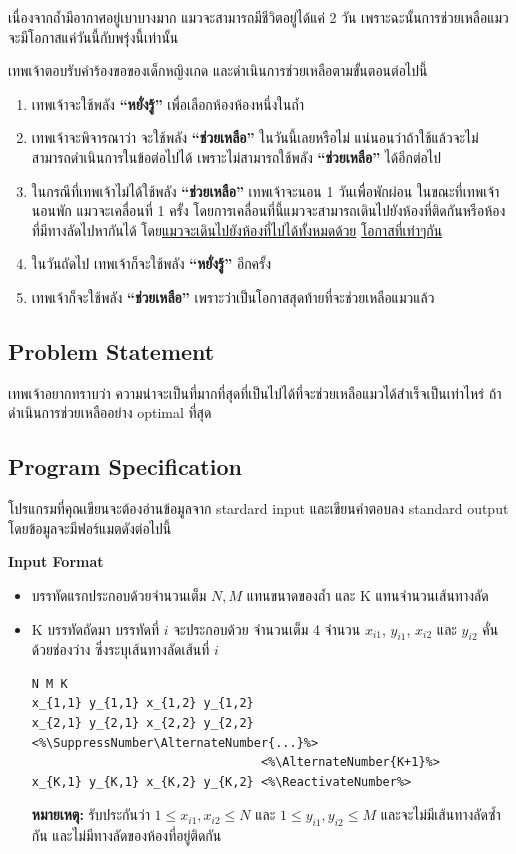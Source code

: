เนื่องจากถ้ำมีอากาศอยู่เบาบางมาก แมวจะสามารถมีชีวิตอยู่ได้แค่ 2 วัน 
เพราะฉะนั้นการช่วยเหลือแมวจะมีโอกาสแค่วันนี้กับพรุ่งนี้เท่านั้น

\newpage
เทพเจ้าตอบรับคำร้องขอของเด็กหญิงเกด และดำเนินการช่วยเหลือตามขั้นตอนต่อไปนี้
\begin{enumerate}
\item เทพเจ้าจะใช้พลัง \textbf{“หยั่งรู้”} เพื่อเลือกห้องห้องหนึ่งในถ้ำ
\item เทพเจ้าจะพิจารณาว่า จะใช้พลัง \textbf{“ช่วยเหลือ”} ในวันนี้เลยหรือไม่ 
    แน่นอนว่าถ้าใช้แล้วจะไม่สามารถดำเนินการในข้อต่อไปได้ 
    เพราะไม่สามารถใช้พลัง \textbf{“ช่วยเหลือ”} ได้อีกต่อไป
\item ในกรณีที่เทพเจ้าไม่ได้ใช้พลัง \textbf{“ช่วยเหลือ”} เทพเจ้าจะนอน 1 วันเพื่อพักผ่อน 
    ในขณะที่เทพเจ้านอนพัก แมวจะเคลื่อนที่ 1 ครั้ง 
    โดยการเคลื่อนที่นี้แมวจะสามารถเดินไปยังห้องที่ติดกันหรือห้องที่มีทางลัดไปหากันได้ 
    โดย\uline{แมวจะเดินไปยังห้องที่ไปได้ทั้งหมดด้วย} \uline{โอกาสที่เท่าๆกัน}
\item ในวันถัดไป เทพเจ้าก็จะใช้พลัง \textbf{“หยั่งรู้”} อีกครั้ง
\item เทพเจ้าก็จะใช้พลัง \textbf{“ช่วยเหลือ”} เพราะว่าเป็นโอกาสสุดท้ายที่จะช่วยเหลือแมวแล้ว
\end{enumerate}

\subsection*{\sectionfont\upshape Problem Statement}

เทพเจ้าอยากทราบว่า ความน่าจะเป็นที่มากที่สุดที่เป็นไปได้ที่จะช่วยเหลือแมวได้สำเร็จเป็นเท่าไหร่ 
ถ้าดำเนินการช่วยเหลืออย่าง optimal ที่สุด

\subsection*{\sectionfont\upshape Program Specification}

โปรแกรมที่คุณเขียนจะต้องอ่านข้อมูลจาก stardard input 
และเขียนคำตอบลง standard output โดยข้อมูลจะมีฟอร์แมตดังต่อไปนี้

\bigskip\noindent
{\sectionfont\bfseries Input Format}
\begin{itemize}
\item บรรทัดแรกประกอบด้วยจำนวนเต็ม $N, M$ แทนขนาดของถ้ำ และ K แทนจำนวนเส้นทางลัด
\item K บรรทัดถัดมา บรรทัดที่ $i$ จะประกอบด้วย จำนวนเต็ม 4 จำนวน 
    $x_{i1}$, $y_{i1}$, $x_{i2}$ และ $y_{i2}$ คั่นด้วยช่องว่าง ซึ่งระบุเส้นทางลัดเส้นที่ $i$
\begin{lstlisting}
N M K
x_{1,1} y_{1,1} x_{1,2} y_{1,2}
x_{2,1} y_{2,1} x_{2,2} y_{2,2} <%\SuppressNumber\AlternateNumber{...}%>
                                <%\AlternateNumber{K+1}%>
x_{K,1} y_{K,1} x_{K,2} y_{K,2} <%\ReactivateNumber%>
\end{lstlisting}
\textbf{หมายเหตุ:} รับประกันว่า $1 \leq x_{i1}, x_{i2} \leq N$ และ 
$1 \leq y_{i1},y_{i2} \leq M$ และจะไม่มีเส้นทางลัดซ้ำกัน และไม่มีทางลัดของห้องที่อยู่ติดกัน
\end{itemize}

